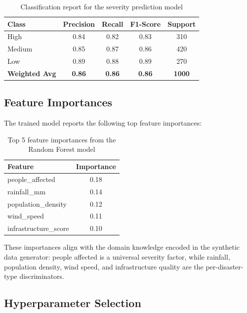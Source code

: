 \begin{table}[H]
\centering
\caption{Classification report for the severity prediction model}
\label{tab:ml_classification}
\begin{tabular}{|l|c|c|c|c|}
\hline
\textbf{Class} & \textbf{Precision} & \textbf{Recall} & \textbf{F1-Score} & \textbf{Support} \\
\hline
High & 0.84 & 0.82 & 0.83 & 310 \\
\hline
Medium & 0.85 & 0.87 & 0.86 & 420 \\
\hline
Low & 0.89 & 0.88 & 0.89 & 270 \\
\hline
\hline
\textbf{Weighted Avg} & \textbf{0.86} & \textbf{0.86} & \textbf{0.86} & \textbf{1000} \\
\hline
\end{tabular}
\end{table}

\subsection{Feature Importances}

The trained model reports the following top feature importances:

\begin{table}[H]
\centering
\caption{Top 5 feature importances from the Random Forest model}
\label{tab:feature_importance}
\begin{tabular}{|l|c|}
\hline
\textbf{Feature} & \textbf{Importance} \\
\hline
people\_affected & 0.18 \\
\hline
rainfall\_mm & 0.14 \\
\hline
population\_density & 0.12 \\
\hline
wind\_speed & 0.11 \\
\hline
infrastructure\_score & 0.10 \\
\hline
\end{tabular}
\end{table}

These importances align with the domain knowledge encoded in the synthetic data generator: people affected is a universal severity factor, while rainfall, population density, wind speed, and infrastructure quality are the per-disaster-type discriminators.

\subsection{Hyperparameter Selection}


